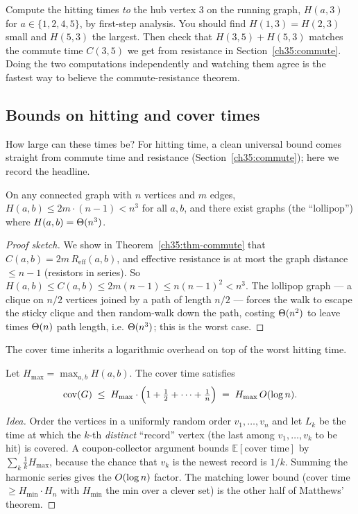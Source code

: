 \begin{labbox}
Compute the hitting times \emph{to} the hub vertex $3$ on the running graph, $H(a,3)$ for $a\in\{1,2,4,5\}$, by first-step analysis. You should find $H(1,3)=H(2,3)$ small and $H(5,3)$ the largest. Then check that $H(3,5)+H(5,3)$ matches the commute time $C(3,5)$ we get from resistance in Section~\ref{ch35:commute}. Doing the two computations independently and watching them agree is the fastest way to believe the commute-resistance theorem.
\end{labbox}

\subsection{Bounds on hitting and cover times}

How large can these times be? For hitting time, a clean universal bound comes straight from commute time and resistance (Section~\ref{ch35:commute}); here we record the headline.

\begin{theorem}\label{ch35:thm-hitbound}
On any connected graph with $n$ vertices and $m$ edges, $H(a,b)\le 2m\cdot(n-1) < n^3$ for all $a,b$, and there exist graphs (the ``lollipop'') where $H(a,b)=\Theta(n^3)$.
\end{theorem}

\begin{proof}[Proof sketch]
We show in Theorem~\ref{ch35:thm-commute} that $C(a,b)=2m\,R_{\mathrm{eff}}(a,b)$, and effective resistance is at most the graph distance $\le n-1$ (resistors in series). So $H(a,b)\le C(a,b)\le 2m(n-1)\le n(n-1)^2<n^3$. The lollipop graph --- a clique on $n/2$ vertices joined by a path of length $n/2$ --- forces the walk to escape the sticky clique and then random-walk down the path, costing $\Theta(n^2)$ to leave times $\Theta(n)$ path length, i.e. $\Theta(n^3)$; this is the worst case.
\end{proof}

The cover time inherits a logarithmic overhead on top of the worst hitting time.

\begin{theorem}\label{ch35:thm-matthews}
Let $H_{\max}=\max_{a,b}H(a,b)$. The cover time satisfies
\[
  \mathrm{cov}(G)\;\le\; H_{\max}\cdot\Big(1+\tfrac12+\cdots+\tfrac1n\Big)\;=\;H_{\max}\,O(\log n).
\]
\end{theorem}

\begin{proof}[Idea]
Order the vertices in a uniformly random order $v_1,\dots,v_n$ and let $L_k$ be the time at which the $k$-th \emph{distinct} ``record'' vertex (the last among $v_1,\dots,v_k$ to be hit) is covered. A coupon-collector argument bounds $\mathbb{E}[\text{cover time}]$ by $\sum_k \frac{1}{k}H_{\max}$, because the chance that $v_k$ is the newest record is $1/k$. Summing the harmonic series gives the $O(\log n)$ factor. The matching lower bound (cover time $\ge H_{\min}\cdot H_n$ with $H_{\min}$ the min over a clever set) is the other half of Matthews' theorem.
\end{proof}


